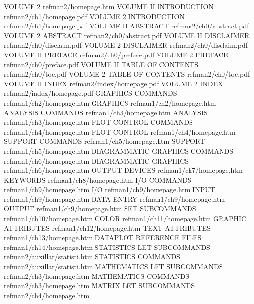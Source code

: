 VOLUME 2                                refman2/homepage.htm
VOLUME II INTRODUCTION                  refman2/ch1/homepage.pdf
VOLUME 2 INTRODUCTION                   refman2/ch1/homepage.pdf
VOLUME II ABSTRACT                      refman2/ch0/abstract.pdf
VOLUME 2 ABSTRACT                       refman2/ch0/abstract.pdf
VOLUME II DISCLAIMER                    refman2/ch0/disclaim.pdf
VOLUME 2 DISCLAIMER                     refman2/ch0/disclaim.pdf
VOLUME II PREFACE                       refman2/ch0/preface.pdf
VOLUME 2 PREFACE                        refman2/ch0/preface.pdf
VOLUME II TABLE OF CONTENTS             refman2/ch0/toc.pdf
VOLUME 2 TABLE OF CONTENTS              refman2/ch0/toc.pdf
VOLUME II INDEX                         refman2/index/homepage.pdf
VOLUME 2 INDEX                          refman2/index/homepage.pdf
GRAPHICS COMMANDS                       refman1/ch2/homepage.htm
GRAPHICS                                refman1/ch2/homepage.htm
ANALYSIS COMMANDS                       refman1/ch3/homepage.htm
ANALYSIS                                refman1/ch3/homepage.htm
PLOT CONTROL COMMANDS                   refman1/ch4/homepage.htm
PLOT CONTROL                            refman1/ch4/homepage.htm
SUPPORT COMMANDS                        refman1/ch5/homepage.htm
SUPPORT                                 refman1/ch5/homepage.htm
DIAGRAMMATIC GRAPHICS COMMANDS          refman1/ch6/homepage.htm
DIAGRAMMATIC GRAPHICS                   refman1/ch6/homepage.htm
OUTPUT DEVICES                          refman1/ch7/homepage.htm
KEYWORDS                                refman1/ch8/homepage.htm
I/O COMMANDS                            refman1/ch9/homepage.htm
I/O                                     refman1/ch9/homepage.htm
INPUT                                   refman1/ch9/homepage.htm
DATA ENTRY                              refman1/ch9/homepage.htm
OUTPUT                                  refman1/ch9/homepage.htm
SET SUBCOMMANDS                         refman1/ch10/homepage.htm
COLOR                                   refman1/ch11/homepage.htm
GRAPHIC ATTRIBUTES                      refman1/ch12/homepage.htm
TEXT ATTRIBUTES                         refman1/ch13/homepage.htm
DATAPLOT REFERENCE FILES                refman1/ch14/homepage.htm
STATISTICS LET SUBCOMMANDS              refman2/auxillar/statisti.htm
STATISTICS COMMANDS                     refman2/auxillar/statisti.htm
MATHEMATICS LET SUBCOMMANDS             refman2/ch3/homepage.htm
MATHEMATICS COMMANDS                    refman2/ch3/homepage.htm
MATRIX LET SUBCOMMANDS                  refman2/ch4/homepage.htm
